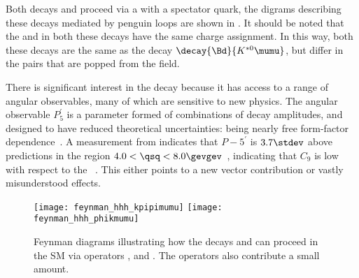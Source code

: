 
Both decays \btokpipimumu and \btophikmumu proceed via a \decay{\bquark}{\squark\mumu} \fcnc with a
spectator \uquark quark, the digrams describing these decays mediated by penguin loops are shown in
.
It should be noted that the \Bp and \Kp in both these decays have the same charge assignment.
In this way, both these decays are the same as the \fcnc decay $\decay{\Bd}{K^{*0}\mumu}$, but
differ in the \qqbar pairs that are popped from the \QCD field.

There is significant interest in the decay \btokstrmumu because it has access to a range of angular
observables, many of which are sensitive to new physics.
The angular observable $P_5^\prime$ is a parameter formed of combinations of \Kstarz decay
amplitudes, and designed to have reduced theoretical uncertainties: being nearly free form-factor
dependence~\cite{LHCb-PAPER-2013-037}.
A measurement from \lhcb indicates that $P-5^\prime$ is $3.7\stdev$ above
predictions in the region $4.0<\qsq<8.0\gevgev$~\cite{LHCb-CONF-2015-002},
indicating that $C_9$ is low with respect to the \sm~\cite{Altmannshofer:2014rta}.
This either points to a new vector contribution or vastly misunderstood \QCD effects.



\begin{figure}
  \begin{center}
    \texttt{[image: feynman\_hhh\_kpipimumu]}
    \texttt{[image: feynman\_hhh\_phikmumu]}
    \caption[Feynman diagrams for \btokpipimumu and \btophikmumu]
    {
      Feynman diagrams illustrating how the decays \btokpipimumu and \btophikmumu can proceed in
      the SM via operators ,  and .
      The operators  also contribute a small amount.
    }
    \label{fig:hhh:feyn}
  \end{center}
\end{figure}

